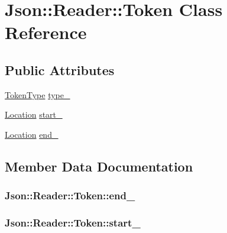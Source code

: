 \hypertarget{classJson_1_1Reader_1_1Token}{}\section{Json\+:\+:Reader\+:\+:Token Class Reference}
\label{classJson_1_1Reader_1_1Token}
\subsection*{Public Attributes}
\begin{DoxyCompactItemize}
\item 
\hyperlink{classJson_1_1Reader_aa35e6ab574dc399a0a645ad98ed66bc9}{Token\+Type} \hyperlink{classJson_1_1Reader_1_1Token_aa0f06d0105ec3d8cb42427c66b991bad}{type\+\_\+}
\item 
\hyperlink{classJson_1_1Reader_a46795b5b272bf79a7730e406cb96375a}{Location} \hyperlink{classJson_1_1Reader_1_1Token_aff87d677b9ac4b52542a00b0d6673249}{start\+\_\+}
\item 
\hyperlink{classJson_1_1Reader_a46795b5b272bf79a7730e406cb96375a}{Location} \hyperlink{classJson_1_1Reader_1_1Token_a7d3bc0fa40097f435d184be4b1fd5ae1}{end\+\_\+}
\end{DoxyCompactItemize}


\subsection{Member Data Documentation}
\subsubsection[{\texorpdfstring{end\+\_\+}{end_}}]{ Json\+::\+Reader\+::\+Token\+::end\+\_\+}\hypertarget{classJson_1_1Reader_1_1Token_a7d3bc0fa40097f435d184be4b1fd5ae1}{}\label{classJson_1_1Reader_1_1Token_a7d3bc0fa40097f435d184be4b1fd5ae1}
\subsubsection[{\texorpdfstring{start\+\_\+}{start_}}]{ Json\+::\+Reader\+::\+Token\+::start\+\_\+}\hypertarget{classJson_1_1Reader_1_1Token_aff87d677b9ac4b52542a00b0d6673249}{}\label{classJson_1_1Reader_1_1Token_aff87d677b9ac4b52542a00b0d6673249}
